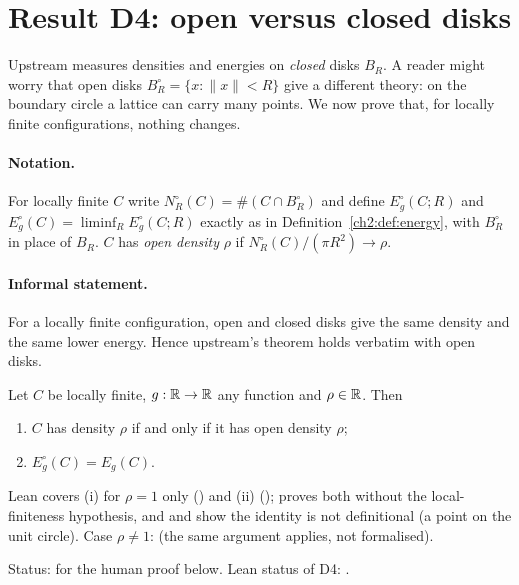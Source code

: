 \section{Result D4: open versus closed disks}\label{ch2:sec:d4}

Upstream measures densities and energies on \emph{closed} disks $B_R$. A reader might worry that open disks
$B_R^\circ=\{x:\|x\|<R\}$ give a different theory: on the boundary circle a lattice can carry many points. We now prove
that, for locally finite configurations, nothing changes.

\paragraph{Notation.} For locally finite $C$ write $N^\circ_R(C)=\#(C\cap B^\circ_R)$ and define $E^\circ_g(C;R)$ and
$E^\circ_g(C)=\liminf_RE^\circ_g(C;R)$ exactly as in Definition~\ref{ch2:def:energy}, with $B^\circ_R$ in place of $B_R$.
$C$ has \emph{open density} $\rho$ if $N^\circ_R(C)/(\pi R^2)\to\rho$.

\paragraph{Informal statement.} For a locally finite configuration, open and closed disks give the same density and the
same lower energy. Hence upstream's theorem holds verbatim with open disks.

\begin{theorem}[D4]\label{ch2:thm:d4}
Let $C$ be locally finite, $g:\mathbb{R}\to\mathbb{R}$ any function and $\rho\in\mathbb{R}$. Then
\begin{enumerate}[label=(\roman*)]
\item $C$ has density $\rho$ if and only if it has open density $\rho$;
\item $E^\circ_g(C)=E_g(C)$.
\end{enumerate}
\end{theorem}

Lean covers (i) for $\rho=1$ only () and (ii) ();
 proves both without the local-finiteness hypothesis, and  and  show
the identity is not definitional (a point on the unit circle). Case $\rho\ne1$: \tierC{} (the same argument applies,
not formalised).

Status: \tierC{} for the human proof below. Lean status of D4: \DFourStatus.

